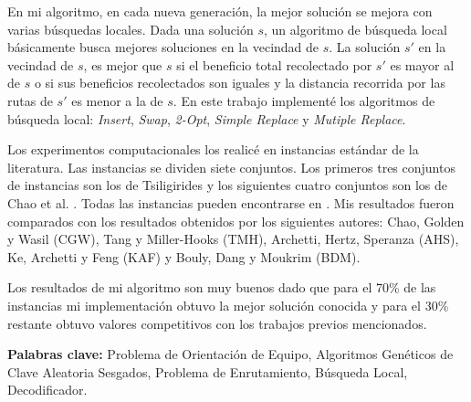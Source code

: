 \bigskip

En mi algoritmo, en cada nueva generación, la mejor solución se mejora con varias búsquedas locales. Dada una solución $s$, un algoritmo de búsqueda local básicamente busca mejores soluciones en la vecindad de $s$. La solución $s'$ en la vecindad de $s$, es mejor que $s$ si el beneficio total recolectado por $s'$ es mayor al de $s$ o si sus beneficios recolectados son iguales y la distancia recorrida por las rutas de $s'$ es menor a la de $s$. En este trabajo implementé los algoritmos de búsqueda local: \textit{Insert}, \textit{Swap}, \textit{2-Opt}, \textit{Simple Replace} y \textit{Mutiple Replace}.

\bigskip

Los experimentos computacionales los realicé en instancias estándar de la literatura. Las instancias se dividen siete conjuntos. Los primeros tres conjuntos de instancias son los de Tsiligirides \cite{Tsiligirides} y los siguientes cuatro conjuntos son los de Chao et al. \cite{ChaoGoldenWasil}. Todas las instancias pueden encontrarse en \cite{IntancesChaoTsiligirides}. Mis resultados fueron comparados con los resultados obtenidos por los siguientes autores: Chao, Golden y Wasil \cite{ChaoGoldenWasil} (CGW), Tang y Miller-Hooks \cite{TangMillerHooks} (TMH), Archetti, Hertz, Speranza \cite{ArchettiHertzSperanza} (AHS), Ke, Archetti y Feng \cite{KeArchettiFeng} (KAF) y Bouly, Dang y Moukrim \cite{BoulyDangMoukrim} (BDM). 

\bigskip

Los resultados de mi algoritmo son muy buenos dado que para el 70\% de las instancias mi implementación obtuvo la mejor solución conocida y para el 30\% restante obtuvo valores competitivos con los trabajos previos mencionados.

\bigskip

\noindent\textbf{Palabras clave:} Problema de Orientación de Equipo, Algoritmos Genéticos de Clave Aleatoria Sesgados, Problema de Enrutamiento, Búsqueda Local, Decodificador.
